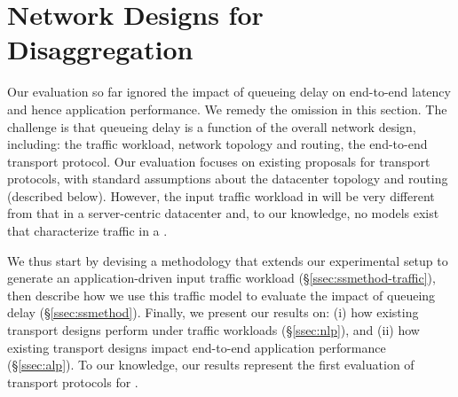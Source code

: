 \vspace{-0.1in}
\section{Network Designs for Disaggregation}
\label{sec:existing}
\vspace{-0.05in}
Our evaluation so far ignored the impact of queueing delay on end-to-end latency and hence application performance. We remedy the omission in this section.
The challenge is that queueing delay is a function of the overall network design, including: the traffic workload, network topology and routing, the end-to-end transport protocol. Our evaluation focuses on existing proposals for transport protocols, with standard assumptions about the datacenter topology and routing (described below). However, the input traffic workload in \dis will be very different from that in a server-centric datacenter and, to our knowledge, no models exist that characterize traffic in a \dis. 

We thus start by devising a methodology that extends our experimental setup to generate an application-driven input traffic workload (\S\ref{ssec:ssmethod-traffic}), then describe how we use this traffic model to evaluate the impact of queueing delay (\S\ref{ssec:ssmethod}). Finally, we present our results on: (i) how existing transport designs perform under \dis traffic workloads (\S\ref{ssec:nlp}), and (ii) how existing transport designs impact end-to-end application performance (\S\ref{ssec:alp}). To our knowledge, our results represent the first evaluation of transport protocols for \dis. 


